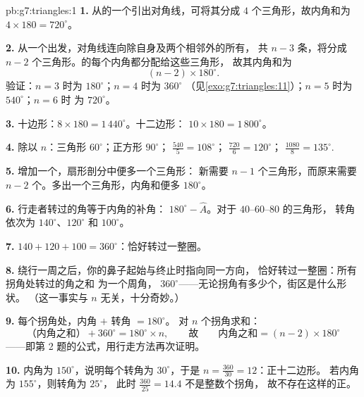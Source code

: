 \begin{solution}{pb:g7:triangles:1}
\textbf{1.} 从的一个引出对角线，可将其分成
$4$ 个三角形，故内角和为
$4 \times 180 = 720^\circ$。

\textbf{2.} 从一个出发，对角线连向除自身及两个相邻外的所有，
共 $n - 3$ 条，将分成
$n - 2$ 个三角形。的每个内角都分配给这些三角形，
故其内角和为
\[
(n - 2) \times 180^\circ .
\]
验证：$n = 3$ 时为 $180^\circ$；$n = 4$ 时为 $360^\circ$
（见\cref{exo:g7:triangles:11}）；$n = 5$ 时为 $540^\circ$；$n = 6$ 时
为 $720^\circ$。

\textbf{3.} 十边形：$8 \times 180 = 1\,440^\circ$。十二边形：
$10 \times 180 = 1\,800^\circ$。

\textbf{4.} 除以 $n$：三角形 $60^\circ$；正方形
$90^\circ$； $\frac{540}{5} = 108^\circ$；
$\frac{720}{6} = 120^\circ$； $\frac{1080}{8} =
135^\circ$.

\textbf{5.} 增加一个，扇形剖分中便多一个三角形：
新需要 $n - 1$ 个三角形，而原来需要
$n - 2$ 个。多出一个三角形，内角和便多 $180^\circ$。

\textbf{6.} 行走者转过的角等于内角的补角：
$180^\circ - \widehat A$。对于 $40$--$60$--$80$ 的三角形，
转角依次为 $140^\circ$、$120^\circ$ 和 $100^\circ$。

\textbf{7.} $140 + 120 + 100 = 360^\circ$：恰好转过一整圈。

\textbf{8.} 绕行一周之后，你的鼻子起始与终止时指向同一方向，
恰好转过一整圈：所有拐角处转过的角之和
为一个周角，
$360^\circ$——无论拐角有多少个，街区是什么形状。
（这一事实与 $n$ 无关，十分奇妙。）

\textbf{9.} 每个拐角处，内角 $+$ 转角 $= 180^\circ$。
对 $n$ 个拐角求和：
\[
\text{（内角之和）} + 360^\circ = 180^\circ \times n,
\qquad\text{故}\qquad
\text{内角之和} = (n - 2) \times 180^\circ
\]
——即第 2 题的公式，用行走方法再次证明。

\textbf{10.} 内角为 $150^\circ$，说明每个转角为
$30^\circ$，于是 $n = \frac{360}{30} = 12$：正十二边形。
若内角为 $155^\circ$，则转角为 $25^\circ$，
此时 $\frac{360}{25} = 14.4$ 不是整数个拐角，
故不存在这样的正。


\end{solution}
